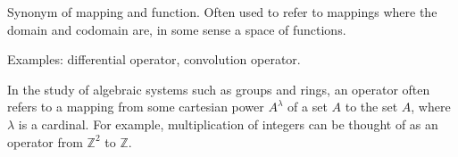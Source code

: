 \documentclass[12pt]{article}
\begin{document}
Synonym of mapping and function. Often used to refer to mappings where the domain
and codomain are, in some sense a space of functions.

Examples: differential operator, convolution operator.

In the study of algebraic systems such as groups and rings, an operator often refers to a mapping from some cartesian power $A^{\lambda}$ of a set $A$ to the set $A$, where $\lambda$ is a cardinal.  For example, multiplication of integers can be thought of as an operator from $\mathbb{Z}^2$ to $\mathbb{Z}$.
\end{document}

